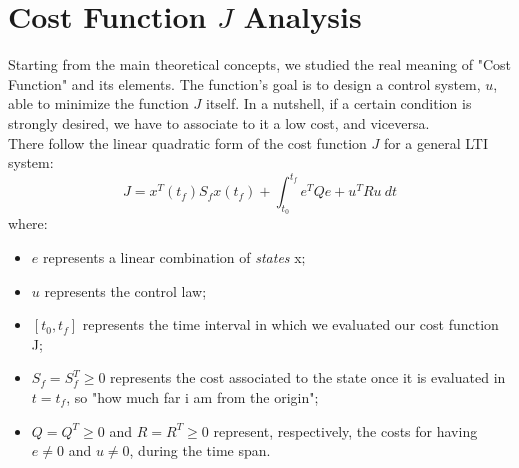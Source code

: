 \section{Cost Function $J$ Analysis}
Starting from the main theoretical concepts, we studied the real meaning of "Cost Function" and its elements. The function's goal is to design a control system, $u$, able to minimize the function $J$ itself. In a nutshell, if a certain condition is strongly desired, we have to associate to it a low cost, and viceversa. \\
There follow the linear quadratic form of the cost function $J$ for a general LTI system:
\begin{equation}
J = x^{T}(t_{f}) S_{f} x(t_{f}) + \int_{t_{0}}^{t_{f}} e^{T} Q e + u^{T} R u \ dt
\end{equation}
where:
\begin{itemize}
	\item $e$ represents a linear combination of \textit{states} x;
	\item $u$ represents the control law;
	\item $ [t_{0},t_{f}] $ represents the time interval in which we evaluated our cost function J;
	\item $ S_{f} = S_{f}^{T} \geq0 $ represents the cost associated to the state once it is evaluated in $t=t_{f}$, so "how much far i am from the origin";
	\item $ Q=Q^{T}\geq 0 $ and $ R=R^{T}\geq 0 $ represent, respectively, the costs for having $e\neq0$ and $u\neq0$, during the time span.
\end{itemize}
